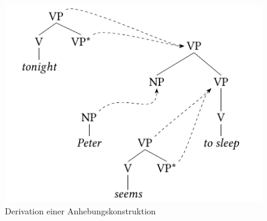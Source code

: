 \begin{figure}[t]
\centering
\includegraphics{graphics/abb511.pdf}
\caption{\label{fig-TAG-raising}Derivation einer Anhebungskonstruktion}
\end{figure}

